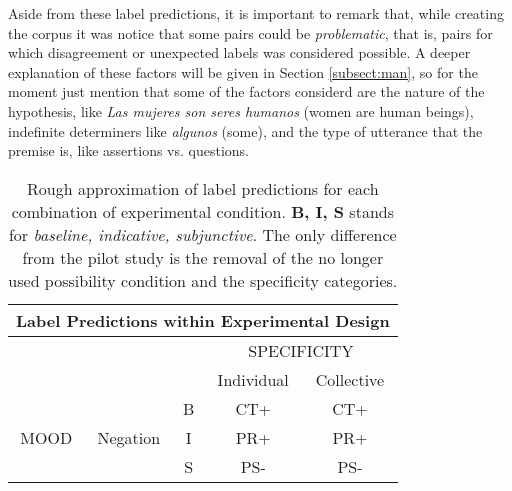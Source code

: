 Aside from these label predictions, it is important to remark that, while creating the corpus it was notice that some pairs could be \textit{problematic}, that is, pairs for which disagreement or unexpected labels was considered possible. A deeper explanation of these factors will be given in Section \ref{subsect:man}, so for the moment just mention that some of the factors considerd are the nature of the hypothesis, like \textit{Las mujeres son seres humanos} (women are human beings), indefinite determiners like \textit{algunos} (some), and the type of utterance that the premise is, like assertions vs. questions.\\

\begin{table}
\centering
\begin{tabular}{|c|c|c|c|c|}
\hline
\multicolumn{5}{|c|}{Label Predictions within Experimental Design}\\\hline
                      & & &\multicolumn{2}{c|}{SPECIFICITY} \\\hline
                      & & & Individual & Collective\\\cline{4-5} 
\multirow{3}{*}{MOOD} & \multirow{3}{*}{Negation} & B & CT+ & CT+ \\\cline{3-5}
                      &                           & I & PR+& PR+ \\\cline{3-5}
                      &                           & S & PS- & PS-\\\hline                                                                           
\end{tabular}
\caption[Label predictions.]{Rough approximation of label predictions for each combination of experimental condition. \textbf{B, I, S} stands for \textit{baseline, indicative, subjunctive}. The only difference from the pilot study is the removal of the no longer used possibility condition and the specificity categories.}
\label{tab:predict}
\end{table}

